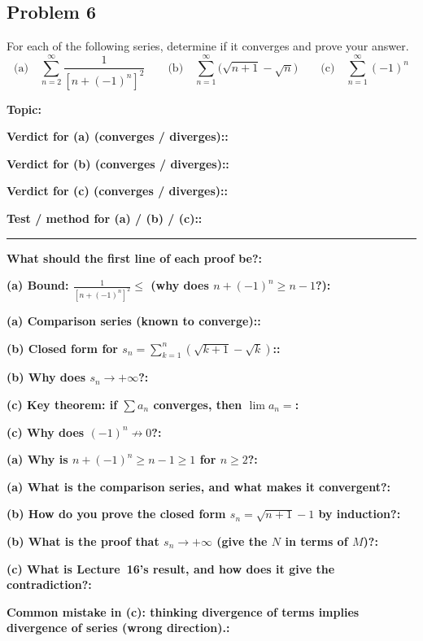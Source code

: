 \documentclass[12pt]{article}
\newcommand{\fillfield}[1]{%
  \par\noindent\textbf{#1:}\enspace\hrulefill\par\vspace{3pt}%
}
\newcommand{\fillfieldlong}[1]{%
  \par\noindent\textbf{#1:}\par\vspace{1.5cm}%
  \noindent\rule{\linewidth}{0.35pt}\par\vspace{4pt}%
}
\begin{document}
\subsection{Problem 6}

\begin{tcolorbox}[
  enhanced, breakable,
  colback  = probblue,
  colframe = blue!55!black,
  fonttitle = \bfseries,
  title = {\textsc{Problem Statement}\hfill Homework 6, Problem 6}
]
For each of the following series, determine if it converges and prove your answer.
\[
  \text{(a)}\quad \sum_{n=2}^{\infty} \frac{1}{[n+(-1)^n]^2}
  \qquad
  \text{(b)}\quad \sum_{n=1}^{\infty}\bigl(\sqrt{n+1}-\sqrt{n}\bigr)
  \qquad
  \text{(c)}\quad \sum_{n=1}^{\infty}(-1)^n
\]
\end{tcolorbox}

\bigskip

\begin{tcolorbox}[
  enhanced, breakable,
  colback  = pass1green,
  colframe = green!55!black,
  fonttitle = \bfseries,
  title = {Pass 1 \enspace\textbf{--}\enspace First Diagnosis}
]
\fillfield{Topic}
\fillfield{Verdict for (a) (converges / diverges):}
\fillfield{Verdict for (b) (converges / diverges):}
\fillfield{Verdict for (c) (converges / diverges):}
\fillfieldlong{Test / method for (a) / (b) / (c):}
\fillfield{What should the first line of each proof be?}
\end{tcolorbox}

\bigskip

\begin{tcolorbox}[
  enhanced, breakable,
  colback  = pass2yellow,
  colframe = yellow!65!black,
  fonttitle = \bfseries,
  title = {Pass 2 \enspace\textbf{--}\enspace Proof Recipe Card}
]
\fillfield{(a) Bound: $\frac{1}{[n+(-1)^n]^2} \leq$ \hrulefill (why does $n+(-1)^n \geq n-1$?)}
\fillfield{(a) Comparison series (known to converge):}
\fillfield{(b) Closed form for $s_n = \sum_{k=1}^n (\sqrt{k+1}-\sqrt{k})$:}
\fillfield{(b) Why does $s_n \to +\infty$?}
\fillfield{(c) Key theorem: if $\sum a_n$ converges, then $\lim a_n =$}
\fillfield{(c) Why does $(-1)^n \not\to 0$?}
\end{tcolorbox}

\bigskip

\begin{tcolorbox}[
  enhanced, breakable,
  colback  = pass3orange,
  colframe = orange!65!black,
  fonttitle = \bfseries,
  title = {Pass 3 \enspace\textbf{--}\enspace Self-Explanation}
]
\fillfield{(a) Why is $n+(-1)^n \geq n-1 \geq 1$ for $n \geq 2$?}
\fillfield{(a) What is the comparison series, and what makes it convergent?}
\fillfield{(b) How do you prove the closed form $s_n = \sqrt{n+1}-1$ by induction?}
\fillfield{(b) What is the proof that $s_n \to +\infty$ (give the $N$ in terms of $M$)?}
\fillfield{(c) What is Lecture~16's result, and how does it give the contradiction?}
\fillfield{Common mistake in (c): thinking divergence of terms implies divergence of series (wrong direction).}
\end{tcolorbox}
\end{document}
